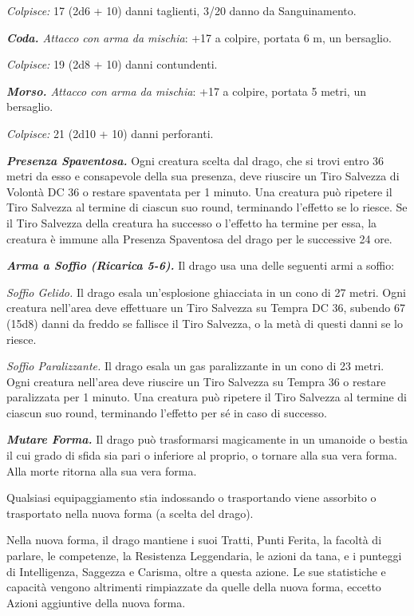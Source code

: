 \begin{multicols}{2}
{\emph{Colpisce:} 17 (2d6 + 10) danni taglienti, 3/20 danno da Sanguinamento.

\emph{\textbf{Coda.} Attacco con arma da mischia}: +17 a colpire, portata 6 m, un bersaglio.

\emph{Colpisce:} 19 (2d8 + 10) danni contundenti.

\emph{\textbf{Morso.} Attacco con arma da mischia}: +17 a colpire, portata 5 metri, un bersaglio.

\emph{Colpisce:} 21 (2d10 + 10) danni perforanti.

\emph{\textbf{Presenza Spaventosa.}} Ogni creatura scelta dal drago, che si trovi entro 36 metri da esso e consapevole della sua presenza, deve riuscire un Tiro Salvezza di Volontà DC 36 o restare spaventata per 1 minuto. Una creatura può ripetere il Tiro Salvezza al termine di ciascun suo round, terminando l'effetto se lo riesce. Se il Tiro Salvezza della creatura ha successo o l'effetto ha termine per essa, la creatura è immune alla Presenza Spaventosa del drago per le successive 24 ore.

\emph{\textbf{Arma a Soffio (Ricarica 5-6).}} Il drago usa una delle seguenti armi a soffio:

\emph{Soffio Gelido.} Il drago esala un'esplosione ghiacciata in un cono di 27 metri. Ogni creatura nell'area deve effettuare un Tiro Salvezza su Tempra DC 36, subendo 67 (15d8) danni da freddo se fallisce il Tiro Salvezza, o la metà di questi danni se lo riesce.

\emph{Soffio Paralizzante.} Il drago esala un gas paralizzante in un cono di 23 metri. Ogni creatura nell'area deve riuscire un Tiro Salvezza su Tempra 36 o restare paralizzata per 1 minuto. Una creatura può ripetere il Tiro Salvezza al termine di ciascun suo round, terminando l'effetto per sé in caso di successo.

\emph{\textbf{Mutare Forma.}} Il drago può trasformarsi magicamente in un umanoide o bestia il cui grado di sfida sia pari o inferiore al proprio, o tornare alla sua vera forma. Alla morte ritorna alla sua vera forma.

Qualsiasi equipaggiamento stia indossando o trasportando viene assorbito o trasportato nella nuova forma (a scelta del drago).

Nella nuova forma, il drago mantiene i suoi Tratti, Punti Ferita, la facoltà di parlare, le competenze, la Resistenza Leggendaria, le azioni da tana, e i punteggi di Intelligenza, Saggezza e Carisma, oltre a questa azione. Le sue statistiche e capacità vengono altrimenti rimpiazzate da quelle della nuova forma, eccetto Azioni aggiuntive della nuova forma.

}
\end{multicols}
